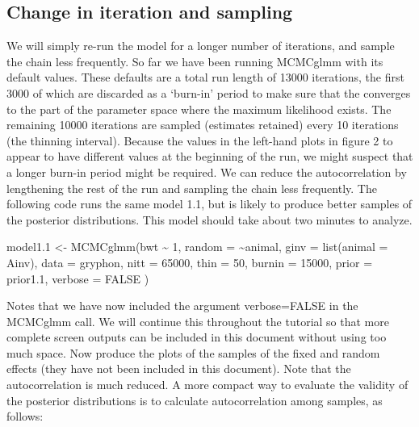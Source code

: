 \documentclass[
  12pt,
]{book}
\newenvironment{Shaded}{\begin{snugshade}}{\end{snugshade}}
\newcommand{\AttributeTok}[1]{\textcolor[rgb]{0.77,0.63,0.00}{#1}}
\newcommand{\ConstantTok}[1]{\textcolor[rgb]{0.00,0.00,0.00}{#1}}
\newcommand{\DecValTok}[1]{\textcolor[rgb]{0.00,0.00,0.81}{#1}}
\newcommand{\FloatTok}[1]{\textcolor[rgb]{0.00,0.00,0.81}{#1}}
\newcommand{\FunctionTok}[1]{\textcolor[rgb]{0.00,0.00,0.00}{#1}}
\newcommand{\NormalTok}[1]{#1}
\newcommand{\OtherTok}[1]{\textcolor[rgb]{0.56,0.35,0.01}{#1}}
\newcommand{\SpecialCharTok}[1]{\textcolor[rgb]{0.00,0.00,0.00}{#1}}
\begin{document}
\hypertarget{change-in-iteration-and-sampling}{%
\subsection{Change in iteration and sampling}\label{change-in-iteration-and-sampling}}

We will simply re-run the model for a longer number of iterations, and sample the chain less frequently. So far we have been running MCMCglmm with its default values. These defaults are a total run length of 13000 iterations, the first 3000 of which are discarded as a `burn-in' period to make sure that the converges to the part of the parameter space where the maximum likelihood exists. The remaining 10000 iterations are sampled (estimates retained) every 10 iterations (the thinning interval). Because the values in the left-hand plots in figure 2 to appear to have different values at the beginning of the run, we might suspect that a longer burn-in period might be required. We can reduce the autocorrelation by lengthening the rest of the run and sampling the chain less frequently. The following code runs the same model 1.1, but is likely to produce better samples of the posterior distributions. This model should take about two minutes to analyze.

\begin{Shaded}
\begin{Highlighting}[]
\NormalTok{model1}\FloatTok{.1} \OtherTok{\textless{}{-}} \FunctionTok{MCMCglmm}\NormalTok{(bwt }\SpecialCharTok{\textasciitilde{}} \DecValTok{1}\NormalTok{,}
  \AttributeTok{random =} \SpecialCharTok{\textasciitilde{}}\NormalTok{animal, }\AttributeTok{ginv =} \FunctionTok{list}\NormalTok{(}\AttributeTok{animal =}\NormalTok{ Ainv),}
  \AttributeTok{data =}\NormalTok{ gryphon, }\AttributeTok{nitt =} \DecValTok{65000}\NormalTok{, }\AttributeTok{thin =} \DecValTok{50}\NormalTok{, }\AttributeTok{burnin =} \DecValTok{15000}\NormalTok{,}
  \AttributeTok{prior =}\NormalTok{ prior1}\FloatTok{.1}\NormalTok{, }\AttributeTok{verbose =} \ConstantTok{FALSE}
\NormalTok{)}
\end{Highlighting}
\end{Shaded}

Notes that we have now included the argument verbose=FALSE in the MCMCglmm call. We will continue this throughout the tutorial so that more complete screen outputs can be included in this document without using too much space. Now produce the plots of the samples of the fixed and random effects (they have not been included in this document). Note that the autocorrelation is much reduced. A more compact way to evaluate the validity of the posterior distributions is to calculate autocorrelation among samples, as follows:
\end{document}
